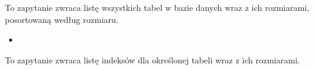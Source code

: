 \documentclass[letterpaper,10pt,polish]{sphinxmanual}
\begin{document}
\sphinxAtStartPar
To zapytanie zwraca listę wszystkich tabel w bazie danych wraz z ich rozmiarami, posortowaną według rozmiaru.
\begin{itemize}
\item {} 
\sphinxAtStartPar
{}

\end{itemize}

\begin{sphinxVerbatim}[commandchars=\\\{\}]
\end{sphinxVerbatim}

\sphinxAtStartPar
To zapytanie zwraca listę indeksów dla określonej tabeli wraz z ich rozmiarami.
\end{document}
